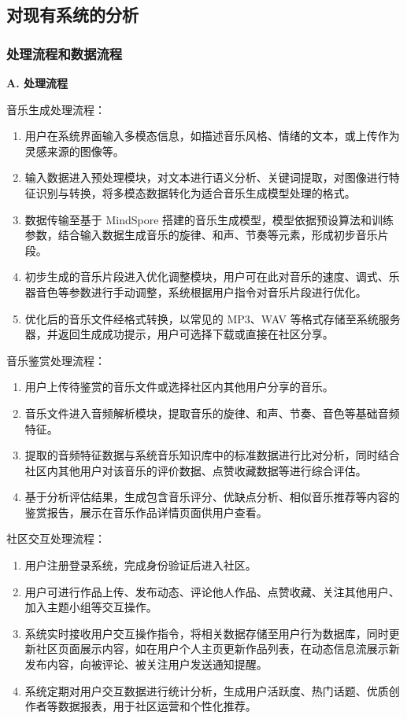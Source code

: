 \documentclass{base}
\begin{document}
\subsection{对现有系统的分析}

\subsubsection{处理流程和数据流程}

\textbf{A. 处理流程}

音乐生成处理流程：

\begin{enumerate}
    \item 用户在系统界面输入多模态信息，如描述音乐风格、情绪的文本，或上传作为灵感来源的图像等。
    \item 输入数据进入预处理模块，对文本进行语义分析、关键词提取，对图像进行特征识别与转换，将多模态数据转化为适合音乐生成模型处理的格式。​
    \item 数据传输至基于 MindSpore 搭建的音乐生成模型，模型依据预设算法和训练参数，结合输入数据生成音乐的旋律、和声、节奏等元素，形成初步音乐片段。​
    \item 初步生成的音乐片段进入优化调整模块，用户可在此对音乐的速度、调式、乐器音色等参数进行手动调整，系统根据用户指令对音乐片段进行优化。​
    \item 优化后的音乐文件经格式转换，以常见的 MP3、WAV 等格式存储至系统服务器，并返回生成成功提示，用户可选择下载或直接在社区分享。
\end{enumerate}

音乐鉴赏处理流程：

\begin{enumerate}
    \item 用户上传待鉴赏的音乐文件或选择社区内其他用户分享的音乐。​
    \item 音乐文件进入音频解析模块，提取音乐的旋律、和声、节奏、音色等基础音频特征。
    \item 提取的音频特征数据与系统音乐知识库中的标准数据进行比对分析，同时结合社区内其他用户对该音乐的评价数据、点赞收藏数据等进行综合评估。​
    \item 基于分析评估结果，生成包含音乐评分、优缺点分析、相似音乐推荐等内容的鉴赏报告，展示在音乐作品详情页面供用户查看。
\end{enumerate}

社区交互处理流程：​

\begin{enumerate}
    \item 用户注册登录系统，完成身份验证后进入社区。​
    \item 用户可进行作品上传、发布动态、评论他人作品、点赞收藏、关注其他用户、加入主题小组等交互操作。​
    \item 系统实时接收用户交互操作指令，将相关数据存储至用户行为数据库，同时更新社区页面展示内容，如在用户个人主页更新作品列表，在动态信息流展示新发布内容，向被评论、被关注用户发送通知提醒。​
    \item 系统定期对用户交互数据进行统计分析，生成用户活跃度、热门话题、优质创作者等数据报表，用于社区运营和个性化推荐。
\end{enumerate}
\end{document}
